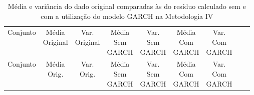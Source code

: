 \clearpage

\begin{center}
\begin{longtable}{ccccccccc}
\toprule
\rowcolor{white}
\caption[Metodologia IV: dados estatísticos]{Média e variância do dado original
comparadas às do resíduo calculado sem e com a utilização do modelo GARCH na
Metodologia IV} \label{tab:DadosEstatisticosMet4}\\
\midrule
    Conjunto & \specialcell{Média\\Original} &
    \specialcell{Var.\\Original} & \specialcell{Média\\Sem\\GARCH} &
    \specialcell{Var.\\Sem\\GARCH} & \specialcell{Média\\Com\\GARCH}&
    \specialcell{Var.\\Com\\GARCH} \\

\midrule
\endfirsthead 
\midrule
\rowcolor{white}
    Conjunto & \specialcell{Média\\Orig.} &
    \specialcell{Var.\\Orig.} & \specialcell{Média\\Sem\\GARCH} &
    \specialcell{Var.\\Sem\\GARCH} & \specialcell{Média\\Com\\GARCH}&
    \specialcell{Var.\\Com\\GARCH} \\


\end{longtable}
\end{center}
